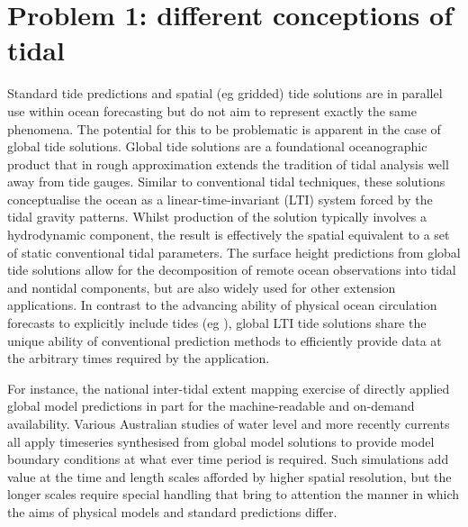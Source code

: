 \section{Problem 1: different conceptions of tidal}
\label{Sec:OfficialGlobal}
Standard tide predictions and spatial (eg gridded) tide solutions are in parallel use within ocean forecasting but do not aim to represent exactly the same phenomena.    The potential for this to be problematic is apparent in the case of global tide solutions. 
Global tide solutions are a foundational oceanographic product that in rough approximation extends the tradition of tidal analysis well away from tide gauges.   Similar to conventional tidal techniques, these solutions conceptualise the ocean as a linear-time-invariant (LTI) system forced by the tidal gravity patterns. Whilst production of the solution typically involves a hydrodynamic component\citep{Egbert:2002ug}, the result is effectively the spatial equivalent to a set of static conventional tidal parameters.   The surface height predictions from global tide solutions allow for the decomposition of remote ocean observations into tidal and nontidal components, but are also widely used for other extension applications.
In contrast to the advancing ability of physical ocean circulation forecasts to explicitly include tides (eg \citep{10.1016/j.ocemod.2019.02.008}), global LTI tide solutions share the unique ability of conventional prediction methods to efficiently provide data at the arbitrary times required by the application.


For instance, the national inter-tidal extent mapping exercise of \citet{10.3390/rs10030480}  directly applied global model predictions in part for the machine-readable and on-demand availability.
Various Australian studies of water level \citep{Haigh:2013bn}\citep{Pattiaratchi2018} and more recently currents \citep{10.5194/os-2020-107} all apply timeseries synthesised from global model solutions to provide model boundary conditions at what ever time period is required.    Such simulations add value at the time and length scales afforded by higher spatial resolution, but the longer scales require special handling that bring to attention the manner in which the aims of physical models and standard predictions differ.

